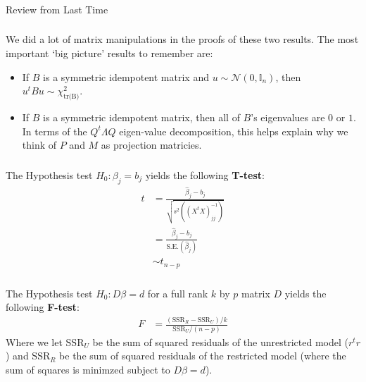 \begin{frame}[fragile] \frametitle{}

\begin{flushright}
{\color{yaleblue}\sc\fontsize{1cm}{0cm}\selectfont Review from Last Time}
\end{flushright}

\end{frame}

\begin{frame}[fragile] \frametitle{}

We did a lot of matrix manipulations in the proofs of these
two results. The most important `big picture' results to
remember are:

\begin{itemize}
\item If $B$ is a symmetric idempotent matrix and
$u \sim \mathcal{N} (0, \mathbb{I}_n)$, then
$u^t B u \sim \chi^2_{\text{tr(B)}}$. \pause
\item If $B$ is a symmetric idempotent matrix, then
all of $B$'s eigenvalues are $0$ or $1$. In terms of
the $Q^t \Lambda Q$ eigen-value decomposition, this
helps explain why we think of $P$ and $M$ as projection
matricies.
\end{itemize}

\end{frame}


\begin{frame}[fragile] \frametitle{}

The Hypothesis test $H_0: \beta_j = b_j$ yields the
following {\bf T-test}:
\begin{align*}
t &= \frac{\widehat{\beta}_j - b_j}{\sqrt{s^2  \left( (X^t X)^{-1}_{jj} \right)}} \\
&= \frac{\widehat{\beta}_j - b_j}{\text{S.E.}(\widehat{\beta}_j)} \\
&\sim t_{n-p}
\end{align*}

\end{frame}


\begin{frame}[fragile] \frametitle{}

The Hypothesis test $H_0: D\beta = d$ for a full rank $k$ by $p$ matrix
$D$ yields the following {\bf F-test}:
\begin{align*}
F &= \frac{(\text{SSR}_R -  \text{SSR}_U) / k }{\text{SSR}_U / (n - p)}
\end{align*}
Where we let $\text{SSR}_U$ be the sum of squared residuals of the unrestricted
model ($r^t r$) and $\text{SSR}_R$ be the sum of squared residuals of the
restricted model (where the sum of squares is minimzed subject
to $D\beta = d$).

\end{frame}


